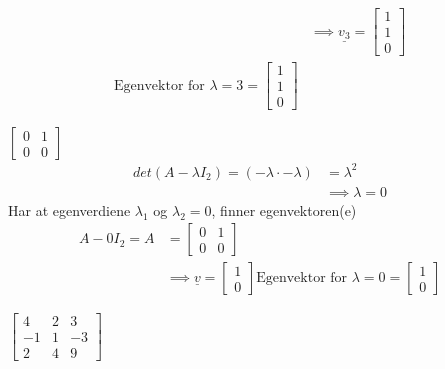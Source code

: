 \documentclass[11pt, a4paper, norsk]{NTNUoving}
\begin{document}
\begin{oppgave}
\begin{punkt}
\begin{align*}
                \\
                &\implies \underline{v_3} = \begin{bmatrix}
                    1 \\
                    1 \\
                    0
                \end{bmatrix}
                \\
                \text{Egenvektor for } \lambda = 3 = \begin{bmatrix}
                    1 \\
                    1 \\
                    0
                \end{bmatrix}
            \end{align*}
        \end{punkt}
        \begin{punkt}
            $\begin{bmatrix}
                0 & 1 \\
                0 & 0
            \end{bmatrix}$
            \begin{align*}
                det(A - \lambda I_{2}) = (-\lambda \cdot -\lambda) &= \lambda^2
                \\
                                                                   &\implies \lambda = 0
            \end{align*}
            Har at egenverdiene $\lambda_1 $ og $\lambda_2 = 0$, finner egenvektoren(e)
            \begin{align*}
                A - 0I_2 = A &= \begin{bmatrix}
                    0 & 1 \\
                    0 & 0
                \end{bmatrix}
                \\
                &\implies \underline{v} = \begin{bmatrix}
                    1 \\
                    0
                \end{bmatrix}
                \text{Egenvektor for } \lambda = 0 = \begin{bmatrix}
                    1 \\
                    0
                \end{bmatrix}
            \end{align*}
        \end{punkt}
        \begin{punkt}
            $\begin{bmatrix}
                4 & 2 & 3 \\
                -1 & 1 & -3 \\
                2 & 4 & 9
            \end{bmatrix}$
            

\end{punkt}
\end{oppgave}
\end{document}

